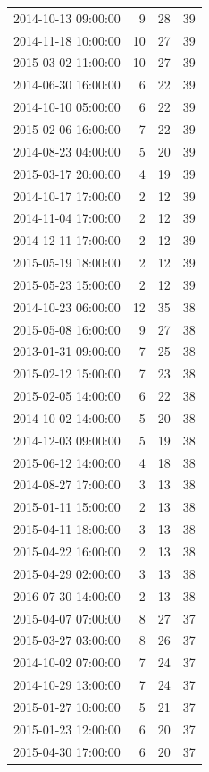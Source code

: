 \begin{tabular}{lrrr}
2014-10-13 09:00:00 & 9 & 28 & 39 \\
2014-11-18 10:00:00 & 10 & 27 & 39 \\
2015-03-02 11:00:00 & 10 & 27 & 39 \\
2014-06-30 16:00:00 & 6 & 22 & 39 \\
2014-10-10 05:00:00 & 6 & 22 & 39 \\
2015-02-06 16:00:00 & 7 & 22 & 39 \\
2014-08-23 04:00:00 & 5 & 20 & 39 \\
2015-03-17 20:00:00 & 4 & 19 & 39 \\
2014-10-17 17:00:00 & 2 & 12 & 39 \\
2014-11-04 17:00:00 & 2 & 12 & 39 \\
2014-12-11 17:00:00 & 2 & 12 & 39 \\
2015-05-19 18:00:00 & 2 & 12 & 39 \\
2015-05-23 15:00:00 & 2 & 12 & 39 \\
2014-10-23 06:00:00 & 12 & 35 & 38 \\
2015-05-08 16:00:00 & 9 & 27 & 38 \\
2013-01-31 09:00:00 & 7 & 25 & 38 \\
2015-02-12 15:00:00 & 7 & 23 & 38 \\
2015-02-05 14:00:00 & 6 & 22 & 38 \\
2014-10-02 14:00:00 & 5 & 20 & 38 \\
2014-12-03 09:00:00 & 5 & 19 & 38 \\
2015-06-12 14:00:00 & 4 & 18 & 38 \\
2014-08-27 17:00:00 & 3 & 13 & 38 \\
2015-01-11 15:00:00 & 2 & 13 & 38 \\
2015-04-11 18:00:00 & 3 & 13 & 38 \\
2015-04-22 16:00:00 & 2 & 13 & 38 \\
2015-04-29 02:00:00 & 3 & 13 & 38 \\
2016-07-30 14:00:00 & 2 & 13 & 38 \\
2015-04-07 07:00:00 & 8 & 27 & 37 \\
2015-03-27 03:00:00 & 8 & 26 & 37 \\
2014-10-02 07:00:00 & 7 & 24 & 37 \\
2014-10-29 13:00:00 & 7 & 24 & 37 \\
2015-01-27 10:00:00 & 5 & 21 & 37 \\
2015-01-23 12:00:00 & 6 & 20 & 37 \\
2015-04-30 17:00:00 & 6 & 20 & 37 \\

\end{tabular}
